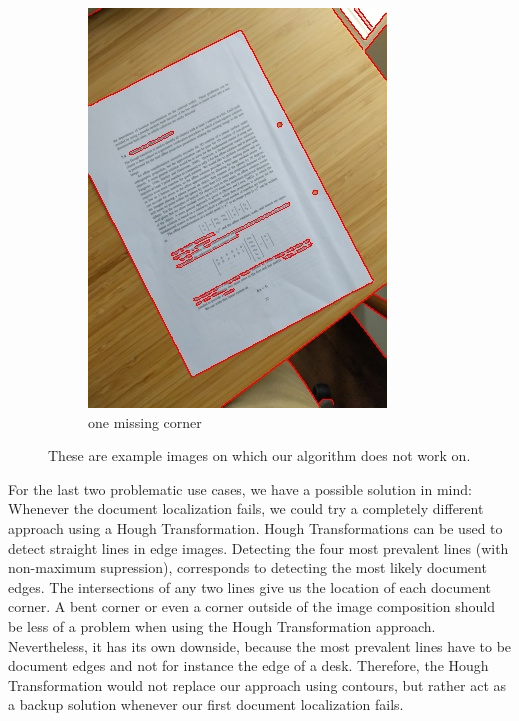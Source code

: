 \documentclass[bibliography=totoc]{scrartcl}
\begin{document}
\begin{figure}[H]
\begin{subfigure}[t]{0.3\linewidth}
		\includegraphics[width=\linewidth]{imgs/contours/missing_corner.jpg}
		\caption{one missing corner}
		\label{subfig:missing_corner}
	\end{subfigure}
	\caption{These are example images on which our algorithm does not work on.}
	\label{fig:known_problems}
\end{figure}

For the last two problematic use cases, we have a possible solution in mind:
Whenever the document localization fails, we could try a completely different approach using a Hough Transformation.
Hough Transformations can be used to detect straight lines in edge images.
Detecting the four most prevalent lines (with non-maximum supression), corresponds to detecting the most likely document edges.
The intersections of any two lines give us the location of each document corner.
A bent corner or even a corner outside of the image composition should be less of a problem when using the Hough Transformation approach.
Nevertheless, it has its own downside, because the most prevalent lines have to be document edges and not for instance the edge of a desk.
Therefore, the Hough Transformation would not replace our approach using contours, but rather act as a backup solution whenever our first document localization fails.\\
\end{document}
